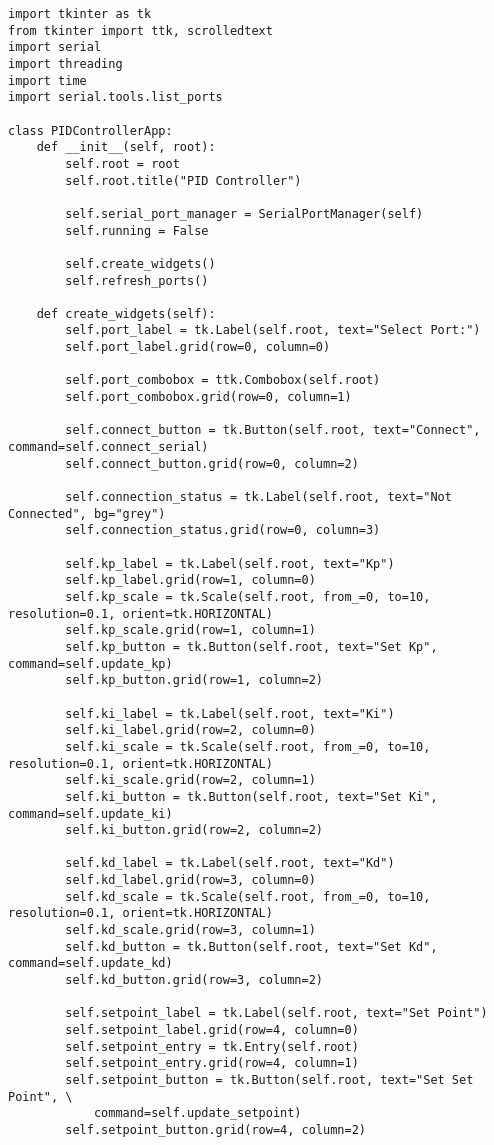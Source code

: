 \documentclass{article}
\begin{document}
\begin{verbatim}
import tkinter as tk
from tkinter import ttk, scrolledtext
import serial
import threading
import time
import serial.tools.list_ports

class PIDControllerApp:
    def __init__(self, root):
        self.root = root
        self.root.title("PID Controller")

        self.serial_port_manager = SerialPortManager(self)
        self.running = False

        self.create_widgets()
        self.refresh_ports()

    def create_widgets(self):
        self.port_label = tk.Label(self.root, text="Select Port:")
        self.port_label.grid(row=0, column=0)

        self.port_combobox = ttk.Combobox(self.root)
        self.port_combobox.grid(row=0, column=1)

        self.connect_button = tk.Button(self.root, text="Connect", command=self.connect_serial)
        self.connect_button.grid(row=0, column=2)

        self.connection_status = tk.Label(self.root, text="Not Connected", bg="grey")
        self.connection_status.grid(row=0, column=3)

        self.kp_label = tk.Label(self.root, text="Kp")
        self.kp_label.grid(row=1, column=0)
        self.kp_scale = tk.Scale(self.root, from_=0, to=10, resolution=0.1, orient=tk.HORIZONTAL)
        self.kp_scale.grid(row=1, column=1)
        self.kp_button = tk.Button(self.root, text="Set Kp", command=self.update_kp)
        self.kp_button.grid(row=1, column=2)

        self.ki_label = tk.Label(self.root, text="Ki")
        self.ki_label.grid(row=2, column=0)
        self.ki_scale = tk.Scale(self.root, from_=0, to=10, resolution=0.1, orient=tk.HORIZONTAL)
        self.ki_scale.grid(row=2, column=1)
        self.ki_button = tk.Button(self.root, text="Set Ki", command=self.update_ki)
        self.ki_button.grid(row=2, column=2)

        self.kd_label = tk.Label(self.root, text="Kd")
        self.kd_label.grid(row=3, column=0)
        self.kd_scale = tk.Scale(self.root, from_=0, to=10, resolution=0.1, orient=tk.HORIZONTAL)
        self.kd_scale.grid(row=3, column=1)
        self.kd_button = tk.Button(self.root, text="Set Kd", command=self.update_kd)
        self.kd_button.grid(row=3, column=2)

        self.setpoint_label = tk.Label(self.root, text="Set Point")
        self.setpoint_label.grid(row=4, column=0)
        self.setpoint_entry = tk.Entry(self.root)
        self.setpoint_entry.grid(row=4, column=1)
        self.setpoint_button = tk.Button(self.root, text="Set Set Point", \
            command=self.update_setpoint)
        self.setpoint_button.grid(row=4, column=2)


\end{verbatim}
\end{document}
